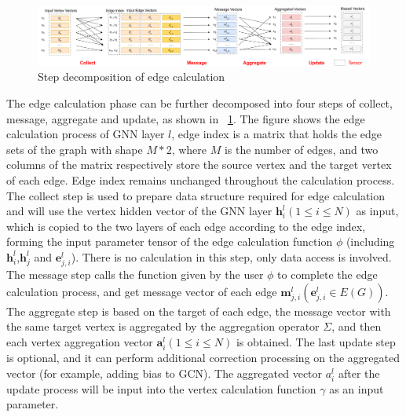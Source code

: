 \begin{figure}
    \centering
    \includegraphics[width=1\columnwidth]{figs/illustration/steps_in_edge_calculation.png}
    \caption{Step decomposition of edge calculation}
    \label{fig:steps_in_edge_calculation}
\end{figure}

The edge calculation phase can be further decomposed into four steps of collect, message, aggregate and update,
as shown in \figurename~\ref{fig:steps_in_edge_calculation}. The figure shows the edge calculation process of GNN layer $l$, 
edge index is a matrix that holds the edge sets of the graph with shape $M*2$, where $M$ is the number of edges,
and two columns of the matrix respectively store the source vertex and the target vertex of each edge.
Edge index remains unchanged throughout the calculation process.
The collect step is used to prepare data structure required for edge calculation and will use the vertex hidden vector of the GNN layer $\boldsymbol{h}_i^l (1 \leq i \leq N)$
as input, which is copied to the two layers of each edge according to the edge index, forming the input parameter tensor of the edge calculation function $\phi$
(including $\boldsymbol{h}_i^l$,$\boldsymbol{h}_j^ l$ and $\boldsymbol{e}_{j, i}^l$).
There is no calculation in this step, only data access is involved. 
The message step calls the function given by the user $\phi$ to complete the edge calculation process, and get message vector of each edge $\boldsymbol{m}_{j, i}^l (\boldsymbol{e}_{j, i}^l \in E(G))$.
The aggregate step is based on the target of each edge, the message vector with the same target vertex is aggregated by the aggregation operator $\Sigma$,
and then each vertex aggregation vector $\boldsymbol{a}_i^l (1 \leq i \leq N)$ is obtained. 
The last update step is optional, and it can perform additional correction processing on the aggregated vector (for example, adding bias to GCN).
The aggregated vector $a_i^l$ after the update process will be input into the vertex calculation function $\gamma$ as an input parameter.

